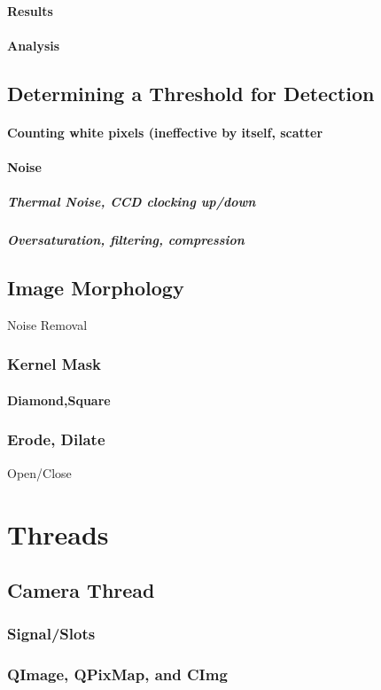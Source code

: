 \documentclass[11pt]{article} %
\begin{document}
\paragraph{Results}
\paragraph{Analysis}
\subsection{Determining a Threshold for Detection}
\paragraph{Counting white pixels (ineffective by itself, scatter}
\paragraph{Noise}
\subparagraph{Thermal Noise, CCD clocking up/down}
\subparagraph{Oversaturation, filtering, compression}
\subsection{Image Morphology}{Noise Removal}
\subsubsection{Kernel Mask}
\paragraph{Diamond,Square}
\subsubsection{Erode, Dilate}{Open/Close}
\section{Threads}
\subsection{Camera Thread}
\subsubsection{Signal/Slots}
\subsubsection{QImage, QPixMap, and CImg}
\end{document}
